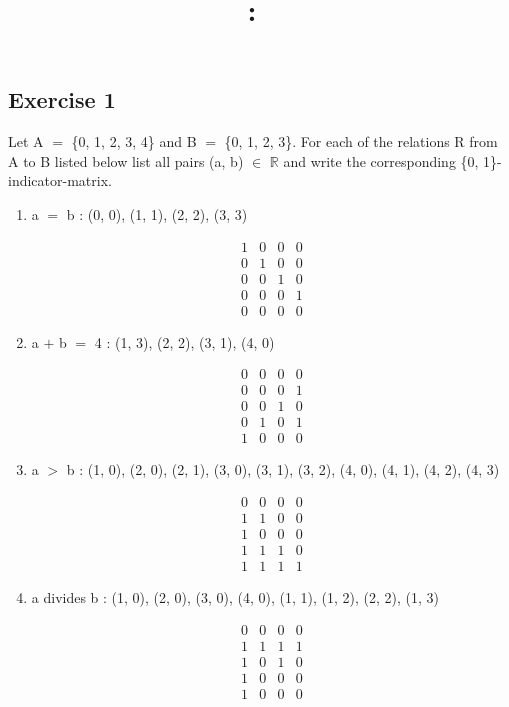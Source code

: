 \documentclass{article}
\title{
    \vspace{2in}
    \textmd{\textbf{\hmwkClass:\ \hmwkTitle}}\\
    \normalsize\vspace{0.1in}\small\vspace{0.1in}\large{\textit{\hmwkClassInstructor}}
    \vspace{3in}
}
\author{\hmwkAuthorName}
\date{}
\newcommand{\mt}[1]{\ensuremath{#1}}
\newcommand\ssc[2][\DefaultOpt]{%
  \def\DefaultOpt{#2}%
  \subsection[#1]{#2}%
}
\newcommand{\balist}{\begin{enumerate}[label=\alph*.]}
\newcommand{\elist}{\end{enumerate}}
\newcommand{\br}{\mt{\mathbb{R}} }       %
\newcommand{\mem}{\mt{\in} }
\newcommand{\bk}[1]{\{#1\}}
\newcommand{\ps}{\mt{+} }
\newcommand{\gr}{\mt{>} }
\newcommand{\eql}{\mt{=} }
\newcommand{\eqn}[1]{\[#1\]}
\begin{document}
\ssc{Exercise 1}{
Let A \eql \bk{0, 1, 2, 3, 4} and B \eql \bk{0, 1, 2, 3}. For each of the relations R from A to B listed below list all pairs (a, b) \mem \br and write the corresponding \bk{0, 1}-indicator-matrix.
\balist
\item a \eql b : (0, 0), (1, 1), (2, 2), (3, 3)

\eqn{\begin{matrix}{}
  1 & 0 & 0 & 0 \\
  0 & 1 & 0 & 0 \\
  0 & 0 & 1 & 0 \\
  0 & 0 & 0 & 1 \\
  0 & 0 & 0 & 0 
\end{matrix}
}

\item a \ps b \eql 4 : (1, 3), (2, 2), (3, 1), (4, 0)

\eqn{\begin{matrix}{}
  0 & 0 & 0 & 0 \\
  0 & 0 & 0 & 1 \\
  0 & 0 & 1 & 0 \\
  0 & 1 & 0 & 1 \\
  1 & 0 & 0 & 0 
\end{matrix}
}

\item a \gr b : (1, 0), (2, 0), (2, 1), (3, 0), (3, 1), (3, 2), (4, 0), (4, 1), (4, 2), (4, 3)

\eqn{\begin{matrix}{}
  0 & 0 & 0 & 0 \\
  1 & 1 & 0 & 0 \\
  1 & 0 & 0 & 0 \\
  1 & 1 & 1 & 0 \\
  1 & 1 & 1 & 1 
\end{matrix}
}

\item a divides b : (1, 0), (2, 0), (3, 0), (4, 0), (1, 1), (1, 2), (2, 2), (1, 3)

\eqn{\begin{matrix}{}
  0 & 0 & 0 & 0 \\
  1 & 1 & 1 & 1 \\
  1 & 0 & 1 & 0 \\
  1 & 0 & 0 & 0 \\
  1 & 0 & 0 & 0 
\end{matrix}
}
\elist

}

\newpage
\end{document}
